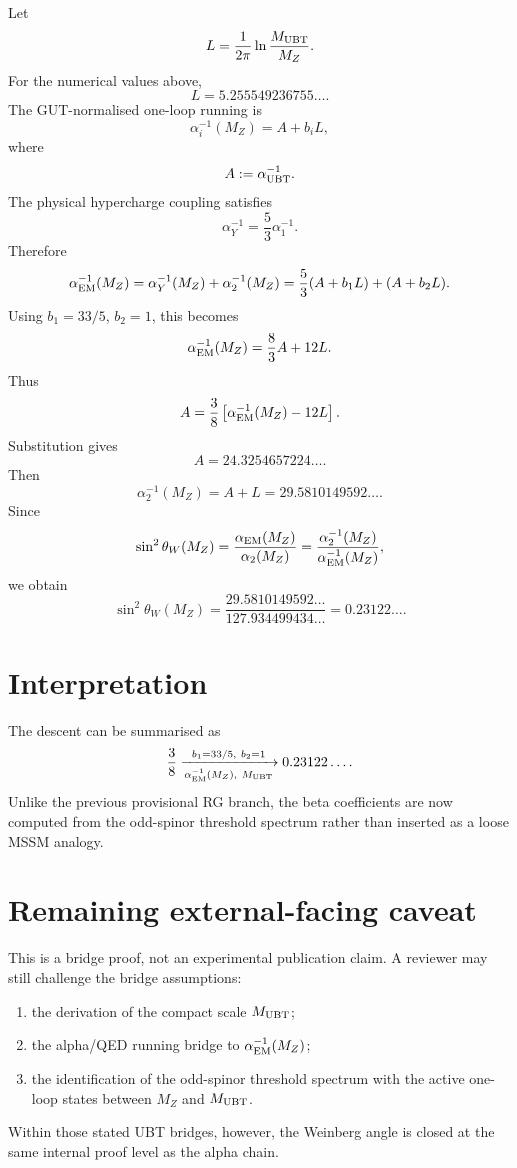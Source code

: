 \documentclass[12pt,a4paper]{article}
\begin{document}
Let
\[
  L=\frac{1}{2\pi}\ln\frac{M_{\rm UBT}}{M_Z}.
\]
For the numerical values above,
\[
  L=5.255549236755\ldots.
\]
The GUT-normalised one-loop running is
\[
  \alpha_i^{-1}(M_Z)=A+b_iL,
\]
where
\[
  A:=\alpha_{\rm UBT}^{-1}.
\]
The physical hypercharge coupling satisfies
\[
  \alpha_Y^{-1}=\frac53\alpha_1^{-1}.
\]
Therefore
\[
  \alpha_{\rm EM}^{-1}(M_Z)
  =
  \alpha_Y^{-1}(M_Z)+\alpha_2^{-1}(M_Z)
  =
  \frac53(A+b_1L)+(A+b_2L).
\]
Using $b_1=33/5$, $b_2=1$, this becomes
\[
  \alpha_{\rm EM}^{-1}(M_Z)
  =
  \frac83A+12L.
\]
Thus
\[
  A
  =
  \frac38\left[\alpha_{\rm EM}^{-1}(M_Z)-12L\right].
\]
Substitution gives
\[
  A=24.3254657224\ldots.
\]
Then
\[
  \alpha_2^{-1}(M_Z)=A+L=29.5810149592\ldots.
\]
Since
\[
  \sin^2\theta_W(M_Z)=\frac{\alpha_{\rm EM}(M_Z)}{\alpha_2(M_Z)}
  =
  \frac{\alpha_2^{-1}(M_Z)}{\alpha_{\rm EM}^{-1}(M_Z)},
\]
we obtain
\[
  \sin^2\theta_W(M_Z)
  =
  \frac{29.5810149592\ldots}{127.934499434\ldots}
  =
  0.23122\ldots.
\]

\section{Interpretation}

The descent can be summarised as
\[
  \frac38
  \xrightarrow[\alpha_{\rm EM}^{-1}(M_Z),\ M_{\rm UBT}]
  {b_1=33/5,\ b_2=1}
  0.23122\ldots.
\]
Unlike the previous provisional RG branch, the beta coefficients are now
computed from the odd-spinor threshold spectrum rather than inserted as a loose
MSSM analogy.

\section{Remaining external-facing caveat}

This is a bridge proof, not an experimental publication claim.  A reviewer may
still challenge the bridge assumptions:
\begin{enumerate}
  \item the derivation of the compact scale $M_{\rm UBT}$;
  \item the alpha/QED running bridge to $\alpha_{\rm EM}^{-1}(M_Z)$;
  \item the identification of the odd-spinor threshold spectrum with the active
  one-loop states between $M_Z$ and $M_{\rm UBT}$.
\end{enumerate}
Within those stated UBT bridges, however, the Weinberg angle is closed at the
same internal proof level as the alpha chain.
\end{document}
